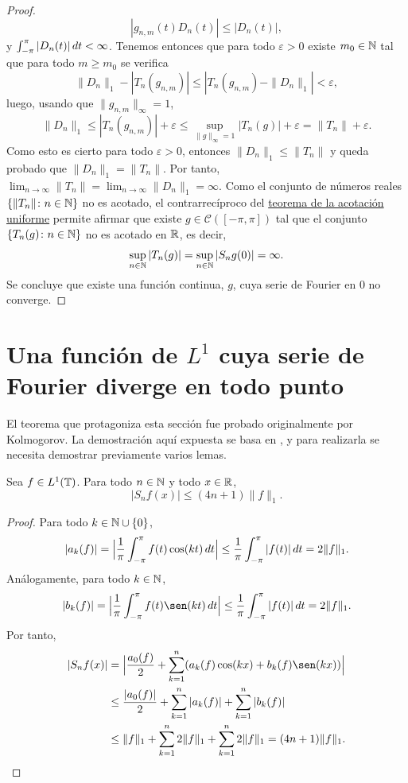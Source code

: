 \documentclass[a4paper, 12pt, oneside]{book}
\begin{document}
\begin{proof}
    \[|g_{n,m}(t) D_n(t)| \leq |D_n(t)|,\]
    y $\int_{-\pi}^{\pi} |D_n(t)| \, dt < \infty$. Tenemos entonces que para todo $\varepsilon >0$ existe $m_0 \in \mathbb N$ tal que para todo $m \geq m_0$ se verifica
    \[\|D_n\|_1 - |T_n(g_{n,m})| \leq  |T_n(g_{n,m}) - \|D_n\|_1| < \varepsilon,\]
    luego, usando que $\|g_{n,m}\|_\infty = 1$,
    \[\|D_n\|_1 \leq |T_n(g_{n,m})| + \varepsilon \leq \sup_{\|g\|_\infty = 1} |T_n(g)| + \varepsilon = \|T_n\| + \varepsilon.\]
    Como esto es cierto para todo $\varepsilon > 0$, entonces $\|D_n\|_1 \leq \|T_n\|$ y queda probado que $\|D_n\|_1 = \|T_n\|$. Por tanto, $\lim_{n \to \infty} \|T_n\| = \lim_{n \to \infty} \|D_n\|_1 = \infty$. Como el conjunto de números reales $\{\|T_n\| \colon n \in \mathbb N\}$ no es acotado, el contrarrecíproco del \hyperref[1.3.1]{\color{blue}teorema de la acotación uniforme} permite afirmar que existe $g \in \mathcal{C}([-\pi,\pi])$ tal que el conjunto $\{T_n(g) \colon n \in \mathbb N\}$ no es acotado en $\mathbb R$, es decir,
    \[\sup_{n \in \mathbb N} |T_n(g)| = \sup_{n \in \mathbb N} |S_ng(0)|= \infty.\]
    Se concluye que existe una función continua, $g$, cuya serie de Fourier en $0$ no converge.
\end{proof}

\section[Una función de \texorpdfstring{$L^1$}{L1} cuya serie de Fourier diverge en todo punto]{Una función de \texorpdfstring{\boldmath$L^1$}{L1} cuya serie de Fourier diverge en todo punto}

El teorema que protagoniza esta sección fue probado originalmente por Kolmogorov. La demostración aquí expuesta se basa en \cite{zygmund}, y para realizarla se necesita demostrar previamente varios lemas.

\begin{lemma}\label{2.2.1}
    Sea $f \in L^1(\mathbb T)$. Para todo $n \in \mathbb N$ y todo $x \in \mathbb R$,
    \[|S_nf(x)| \leq (4n+1)\|f\|_{1}.\]
\end{lemma}

\begin{proof}
    Para todo $k \in \mathbb N \cup \{0\}$,
    \[|a_k(f)| = \Bigl|\frac{1}{\pi}\int_{-\pi}^{\pi} f(t)\cos(kt) \, dt\Bigr| \leq \frac{1}{\pi}\int_{-\pi}^{\pi} |f(t)| \, dt = 2\|f\|_{1}.\]
    Análogamente, para todo $k \in \mathbb N$,
    \[|b_k(f)| = \Bigl|\frac{1}{\pi}\integral{-\pi}{\pi}{f(t)\sen(kt)}\Bigr| \leq \frac{1}{\pi}\integral{-\pi}{\pi}{|f(t)|} = 2\|f\|_{1}.\]
    Por tanto,
    \begin{align*}
        |S_nf(x)| &= \Bigl|\frac{a_0(f)}{2}+\sum_{k=1}^n (a_k(f)\cos(kx)+b_k(f)\sen(kx))\Bigr| \\
        &\leq \frac{|a_0(f)|}{2}+\sum_{k=1}^n|a_k(f)|+\sum_{k=1}^n|b_k(f)| \\
        &\leq \|f\|_{1}+\sum_{k=1}^n2\|f\|_{1}+\sum_{k=1}^n 2\|f\|_{1} =(4n+1)\|f\|_{1}. \qedhere
    \end{align*}
\end{proof}
\end{document}
